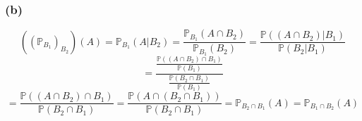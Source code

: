 \documentclass{article}
\begin{document}
\subsubsection*{(b)}

\[
    ((\mathbb{P}_{B_1})_{B_2})(A) = \mathbb{P}_{B_1} (A|B_2) = \frac{\mathbb{P}_{B_1}(A\cap B_2)}{\mathbb{P}_{B_1}(B_2)} = \frac{\mathbb{P}((A\cap B_2) | B_1)}{\mathbb{P}(B_2 | B_1)}
\]
\[
    = \frac{
        \frac{\mathbb{P}((A\cap B_2) \cap B_1)}{\mathbb{P}(B_1)}
    }{
        \frac{\mathbb{P}(B_2 \cap B_1)}{\mathbb{P}(B_1)}
    }
\]
\[
    = \frac{\mathbb{P}((A\cap B_2) \cap B_1)}{\mathbb{P}(B_2 \cap B_1)} = \frac{\mathbb{P}(A \cap (B_2 \cap B_1))}{\mathbb{P}(B_2 \cap B_1)} = \mathbb{P}_{B_2 \cap B_1}(A) = \mathbb{P}_{B_1 \cap B_2}(A)
\]
\end{document}
